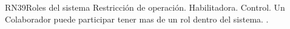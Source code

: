\begin{BussinesRule}{RN39}{Roles del sistema} 
	\BRitem[Tipo:] Restricción de operación. 
	\BRitem[Clase:] Habilitadora. 
	\BRitem[Nivel:] Control. %
	\BRitem[Descripción:] Un Colaborador puede participar tener mas de un rol dentro del sistema.
	 \UCref{}{}. 
\end{BussinesRule}